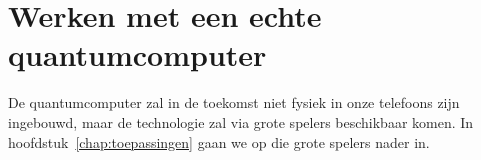 \documentclass[../main.tex]{subfiles}
\begin{document}
\onlyinsubfile{
\setcounter{chapter}{8}
}
\notinsubfile{
}
\section{Werken met een echte quantumcomputer}
\onlyinsubfile{
}
\notinsubfile{
}
De quantumcomputer zal in de toekomst niet fysiek in onze telefoons zijn ingebouwd, maar de technologie zal via grote spelers beschikbaar komen. In hoofdstuk~\ref{chap:toepassingen} gaan we op die grote spelers nader in.

\end{document}
